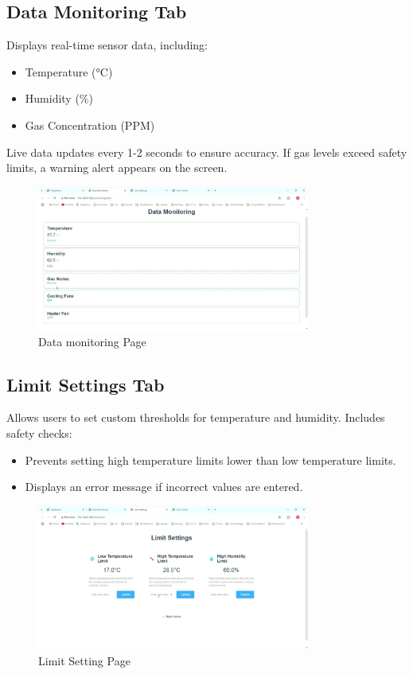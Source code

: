 \documentclass[a4paper]{scrartcl}
\begin{document}
\subsection{ Data Monitoring Tab}
Displays real-time sensor data, including:
\begin{itemize}
    \item Temperature (°C)
    \item Humidity (\%)
    \item Gas Concentration (PPM)
\end{itemize}
Live data updates every 1-2 seconds to ensure accuracy. If gas levels exceed safety limits, a warning alert appears on the screen.

\begin{figure}[H]
    \centering
    \includegraphics[width=0.8\textwidth]{images/DMP.jpg}
  \caption{Data monitoring Page}
\end{figure}



\subsection{ Limit Settings Tab}
Allows users to set custom thresholds for temperature and humidity. Includes safety checks:
\begin{itemize}
    \item Prevents setting high temperature limits lower than low temperature limits.
    \item Displays an error message if incorrect values are entered.
\end{itemize}
\begin{figure}[H]
    \centering
    \includegraphics[width=0.8\textwidth]{images/LSP.jpg}
    \caption{Limit Setting Page}
\end{figure}
\end{document}

